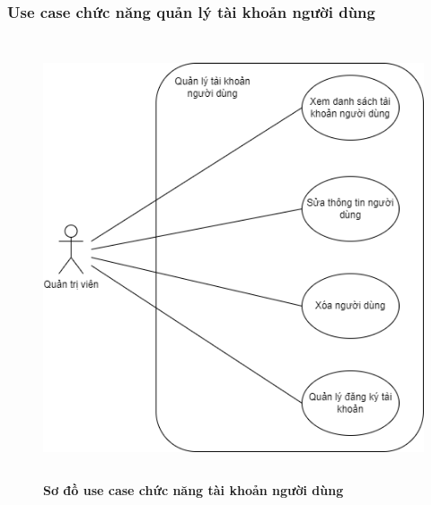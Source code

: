 \subsubsection{Use case chức năng quản lý tài khoản người dùng}
  \begin{figure}[H]
    \centering
    \includegraphics[width=12cm,height=13cm]{Images/use_case/use_case_manage_users.png}
    \caption[Sơ đồ use case chức năng tài khoản người dùng]{\bfseries \fontsize{12pt}{0pt}
    \selectfont Sơ đồ use case chức năng tài khoản người dùng}
    \label{use_case_user_management} %
  \end{figure}

